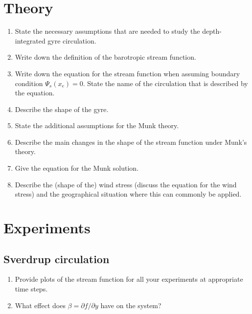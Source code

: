 \begin{question}
\section*{Theory}

\begin{enumerate}
\item State the necessary assumptions that are needed to study the depth-integrated gyre circulation. 

\item Write down the definition of the barotropic stream function. 

\item Write down the equation for the stream function when assuming boundary condition $\Psi_s(x_e)=0$. State the name of the circulation that is described by the equation. 

\item Describe the shape of the gyre. 

\item State the additional assumptions for the Munk theory. 

\item Describe the main changes in the shape of the stream function under Munk's theory. 

\item Give the equation for the Munk solution. 

\item Describe the (shape of the) wind stress (discuss the equation for the wind stress) and the geographical situation where this can commonly be applied. 
\end{enumerate}

\section*{Experiments}

\subsection*{Sverdrup circulation}

\begin{enumerate}
\item Provide plots of the stream function for all your experiments at appropriate time steps. 

\item What effect does $\beta = \partial f / \partial y$ have on the system? 


\end{enumerate}
\end{question}
